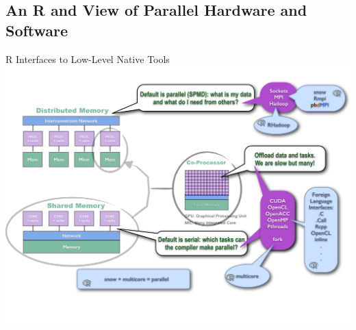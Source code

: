 \subsection{An R and \protect\pbdR View of Parallel Hardware and Software}
\makesubcontentsslidessec

\begin{frame}{R Interfaces to Low-Level Native Tools}
\includegraphics[height=\textheight]
{../common/pics/hardware/ParallelHardware10.pdf}
\end{frame}


